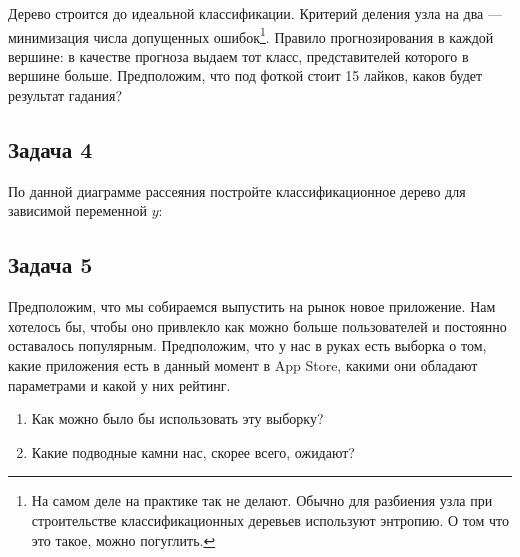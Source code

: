 \documentclass[12pt, a4paper, oneside]{article}
\begin{document}
Дерево строится до идеальной классификации. Критерий деления узла на два — минимизация числа допущенных ошибок\footnote{На самом деле на практике так не делают. Обычно для разбиения узла при строительстве классификационных деревьев используют энтропию. О том что это такое, можно погуглить.}.  Правило прогнозирования в каждой вершине: в качестве прогноза выдаем тот класс, представителей которого в вершине больше.  Предположим, что под фоткой стоит 15 лайков, каков будет результат гадания? 






\subsection*{Задача 4}

По данной диаграмме рассеяния постройте классификационное дерево для зависимой переменной $y$:

	\begin{center}
		\begin{tikzpicture}[scale = 0.015]
		
		\end{tikzpicture}
	\end{center}





\subsection*{Задача 5}

Предположим, что мы собираемся выпустить на рынок новое приложение. Нам хотелось бы,  чтобы оно привлекло как можно больше пользователей и постоянно оставалось популярным. Предположим, что у нас в руках есть выборка о том, какие приложения есть в данный момент в App Store, какими они обладают параметрами и какой у них рейтинг. 

\begin{enumerate} 
	\item Как можно было бы использовать эту выборку? 
	\item Какие подводные камни нас, скорее всего, ожидают? 
\end{enumerate}


\end{document}
